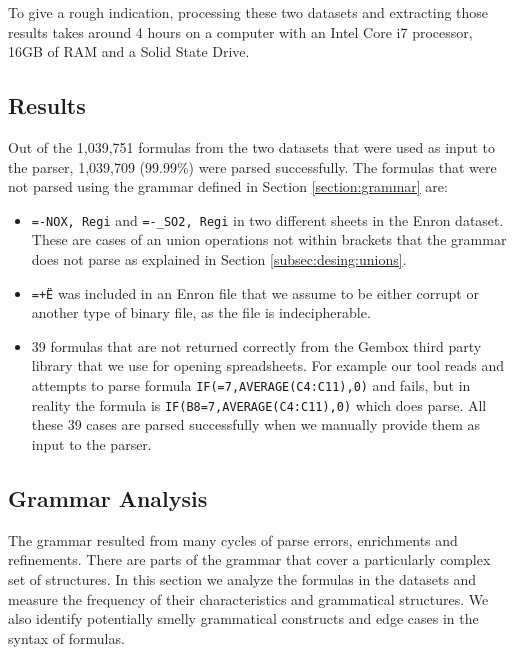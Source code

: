 \documentclass[conference]{IEEEtran}
\begin{document}
To give a rough indication, processing these two datasets and extracting those results takes around 4 hours on a computer with an Intel Core i7 processor, 16GB of RAM and a Solid State Drive.

\subsection{Results}
Out of the 1,039,751 formulas from the two datasets that were used as input to the parser, 1,039,709 (99.99\%) were parsed successfully.
The formulas that were not parsed using the grammar defined in Section \ref{section:grammar} are:

\begin{itemize}
	\item \texttt{=-NOX, Regi} and \texttt{=-_SO2, Regi} in two different sheets in the Enron dataset. These are cases of an union operations not within brackets that the grammar does not parse as explained in Section \ref{subsec:desing:unions}.
	\item \texttt{=+Ë\textperthousand} was included in an Enron file that we assume to be either corrupt or another type of binary file, as the file is indecipherable.
	\item 39 formulas that are not returned correctly from the Gembox third party library that we use for opening spreadsheets. For example our tool reads and attempts to parse formula \texttt{IF(=7,AVERAGE(C4:C11),0)} and fails, but in reality the formula is \texttt{IF(B8=7,AVERAGE(C4:C11),0)} which does parse. All these 39 cases are parsed successfully when we manually provide them as input to the parser.
\end{itemize}

\subsection{Grammar Analysis}
The grammar resulted from many cycles of parse errors, enrichments and refinements. There are parts of the grammar that cover a particularly complex set of structures. In this section we analyze the formulas in the datasets and measure the frequency of their characteristics and grammatical structures. We also identify potentially smelly grammatical constructs and edge cases in the syntax of formulas.
\end{document}
